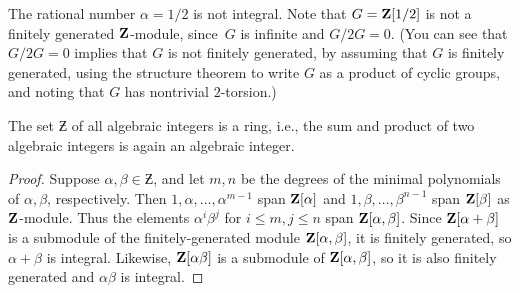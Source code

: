 \begin{example}\label{ex:notint}
The rational number $\alpha=1/2$ is not integral.  Note that
$G=\mathbf{Z}[1/2]$ is not a finitely generated $\mathbf{Z}$-module, since~$G$ is infinite
and $G/2G=0$.  (You can see that $G/2G=0$ implies that $G$ is not finitely
generated, by assuming that $G$ is finitely generated, using the structure
theorem to write $G$ as a product of cyclic groups, and noting that $G$
has nontrivial $2$-torsion.)
\end{example}

\begin{proposition}
The set $\Zbar$ of all algebraic integers is a ring, i.e., the sum and
product of two algebraic integers is again an algebraic integer.
\end{proposition}
\begin{proof}
Suppose $\alpha, \beta\in \Zbar$, and let $m, n$ be the degrees of the
minimal polynomials of $\alpha, \beta$, respectively.  Then
$1,\alpha,\ldots,\alpha^{m-1}$ span $\mathbf{Z}[\alpha]$ and
$1,\beta,\ldots,\beta^{n-1}$ span $\mathbf{Z}[\beta]$ as $\mathbf{Z}$-module.  Thus
the elements $\alpha^i\beta^j$ for $i \leq m, j\leq n$ span
$\mathbf{Z}[\alpha, \beta]$.  Since $\mathbf{Z}[\alpha + \beta]$ is a submodule of the
finitely-generated module $\mathbf{Z}[\alpha, \beta]$, it is finitely
generated, so $\alpha+\beta$ is integral.  Likewise, $\mathbf{Z}[\alpha\beta]$
is a submodule of $\mathbf{Z}[\alpha, \beta]$, so it is also finitely
generated and $\alpha\beta$ is integral.
\end{proof}

